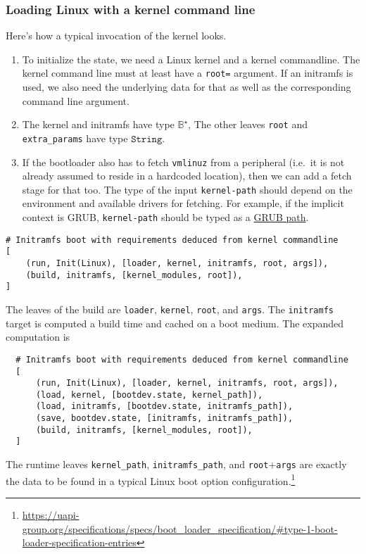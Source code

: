 \subsubsection{Loading Linux with a kernel command line}

Here's how a typical invocation of the kernel looks.

\begin{enumerate}
\def\labelenumi{\arabic{enumi}.}
\tightlist
\item
  To initialize the state, we need a Linux kernel and a kernel commandline. 
  The kernel command line must at least have a \texttt{root=} argument. 
  If an initramfs is used, we also need the underlying data for that as well as the corresponding command line argument. 
\item
  The kernel and initramfs have type \(\mathbb{B}^\star\),
  The other leaves \texttt{root} and \texttt{extra\_params} have type \(\mathtt{String}\).
\item
  If the bootloader also has to fetch \texttt{vmlinuz} from a peripheral
  (i.e.~it is not already assumed to reside in a hardcoded location),
  then we can add a fetch stage for that too. The type of the input
  \texttt{kernel-path} should depend on the environment and available
  drivers for fetching. For example, if the implicit context is GRUB,
  \texttt{kernel-path} should be typed as a
  \href{https://www.gnu.org/software/grub/manual/grub/grub.html\#Naming-convention}{GRUB
  path}.
\end{enumerate}

\begin{verbatim}
# Initramfs boot with requirements deduced from kernel commandline
[
    (run, Init(Linux), [loader, kernel, initramfs, root, args]),
    (build, initramfs, [kernel_modules, root]),
]
\end{verbatim}

The leaves of the build are \texttt{loader}, \texttt{kernel}, \texttt{root}, and \texttt{args}. 
%
The \texttt{initramfs} target is computed a build time and cached on a boot medium.
%
The expanded computation is
\begin{verbatim}
  # Initramfs boot with requirements deduced from kernel commandline
  [
      (run, Init(Linux), [loader, kernel, initramfs, root, args]),
      (load, kernel, [bootdev.state, kernel_path]),
      (load, initramfs, [bootdev.state, initramfs_path]),
      (save, bootdev.state, [initramfs, initramfs_path]),
      (build, initramfs, [kernel_modules, root]),
  ]
\end{verbatim}
The runtime leaves \texttt{kernel\_path}, \texttt{initramfs\_path}, and \texttt{root}+\texttt{args} are exactly the data to be found in a typical Linux boot option configuration.\footnote{\url{https://uapi-group.org/specifications/specs/boot\_loader\_specification/\#type-1-boot-loader-specification-entries}}

